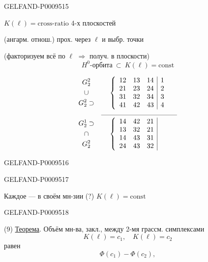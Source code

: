 \begin{GelfandAdjacentEvidence}{GELFAND-P000951}{5}


$K(\ell)=\text{cross-ratio}$ 4-х плоскостей\par
\hspace{2em}(ангарм. отнош.) \quad прох. через $\ell$ и выбр. точки

(факторизуем всё по $\ell$ $\Rightarrow$ получ. в плоскости)
\[
 H^0\text{-орбита}\ \subset\ K(\ell)=\mathrm{const}
\]

\[
 \begin{array}{cc}
  \begin{gathered}
   G_2^2\\
   \cup\\
   G_2^2\supset
  \end{gathered}
  &
  \left\{\begin{array}{ccc|c}
   12&13&14&1\\
   21&23&24&2\\
   31&32&34&3\\
   41&42&43&4
  \end{array}\right.\\
  &\rule{11em}{0.3pt}\\
  \begin{gathered}
   G_2^1\supset\\
   \cap\\
   G_2^2
  \end{gathered}
  &
  \left\{\begin{array}{ccc|c}
   14&42&21&\phantom{1}\\
   13&32&21&\\
   14&43&31&\\
   24&43&32&
  \end{array}\right.
 \end{array}
\]
\end{GelfandAdjacentEvidence}
\begin{GelfandAdjacentEvidence}{GELFAND-P000951}{6}

\end{GelfandAdjacentEvidence}
\begin{GelfandAdjacentEvidence}{GELFAND-P000951}{7}


Каждое --- в своём мн-зии (?) $K(\ell)=\mathrm{const}$
\end{GelfandAdjacentEvidence}
\begin{GelfandAdjacentEvidence}{GELFAND-P000951}{8}


(9) \underline{Теорема}. Объём мн-ва, закл., между 2-мя грассм. симплексами
\[
 K(\ell)=c_1,\quad K(\ell)=c_2
\]
равен
\[
 \Phi(c_1)-\Phi(c_2),
\]
\end{GelfandAdjacentEvidence}

